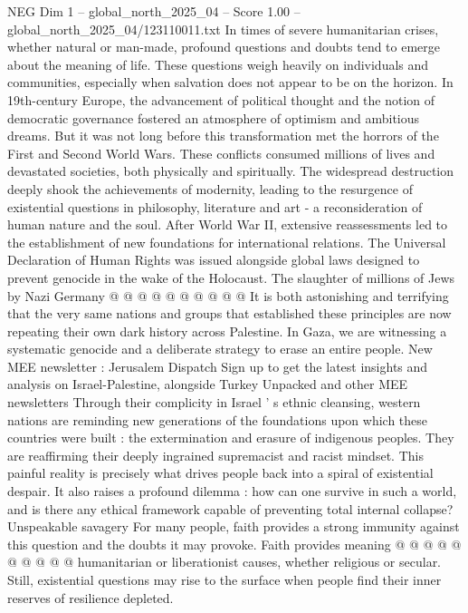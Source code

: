 \begin{textsample}{NEG Dim 1 – global\_north\_2025\_04 – Score 1.00 – global\_north\_2025\_04/123110011.txt}  \label{ex:f1_neg_042}
In times of severe humanitarian crises, whether natural or man-made, profound questions and doubts tend to emerge about the meaning of life.
These questions weigh heavily on individuals and communities, especially when salvation does not appear to be on the horizon.
In 19th-century Europe, the advancement of political thought and the notion of democratic governance fostered an atmosphere of optimism and ambitious dreams.
But it was not long before this transformation met the horrors of the First and Second World Wars.
These conflicts consumed millions of lives and devastated societies, both physically and spiritually.
The widespread destruction deeply shook the achievements of modernity, leading to the resurgence of existential questions in philosophy, literature and art - a reconsideration of human nature and the soul.
After World War II, extensive reassessments led to the establishment of new foundations for international relations.
The Universal Declaration of Human Rights was issued alongside global laws designed to prevent genocide in the wake of the Holocaust.
The slaughter of millions of Jews by Nazi Germany @ @ @ @ @ @ @ @ @ @ It is both astonishing and terrifying that the very same nations and groups that established these principles are now repeating their own dark history across Palestine.
In Gaza, we are witnessing a systematic genocide and a deliberate strategy to erase an entire people.
New MEE newsletter : Jerusalem Dispatch Sign up to get the latest insights and analysis on Israel-Palestine, alongside Turkey Unpacked and other MEE newsletters Through their complicity in Israel ' s ethnic cleansing, western nations are reminding new generations of the foundations upon which these countries were built : the extermination and erasure of indigenous peoples.
They are reaffirming their deeply ingrained supremacist and racist mindset.
This painful reality is precisely what drives people back into a spiral of existential despair.
It also raises a profound dilemma : how can one survive in such a world, and is there any ethical framework capable of preventing total internal collapse?
Unspeakable savagery For many people, faith provides a strong immunity against this question and the doubts it may provoke.
Faith provides meaning @ @ @ @ @ @ @ @ @ @ humanitarian or liberationist causes, whether religious or secular.
Still, existential questions may rise to the surface when people find their inner reserves of resilience depleted.

\end{textsample}
